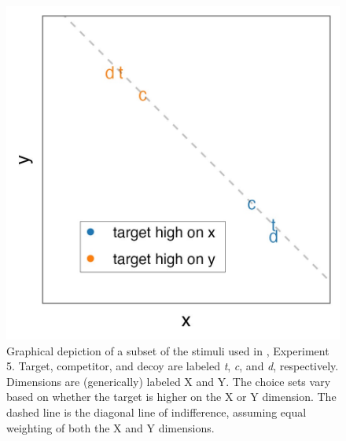 \begin{figure}
    \includegraphics[width=150mm]{figures/banerjee_stim.jpeg}
    \caption{Graphical depiction of a subset of the stimuli used in \textcite{banerjeeFactorsThatPromote2024}, Experiment 5. Target, competitor, and decoy are labeled \textit{t}, \textit{c}, and \textit{d}, respectively. Dimensions are (generically) labeled X and Y. The choice sets vary based on whether the target is higher on the X or Y dimension. The dashed line is the diagonal line of indifference, assuming equal weighting of both the X and Y dimensions.}
    \label{fig:banerjee_stim}
\end{figure}

